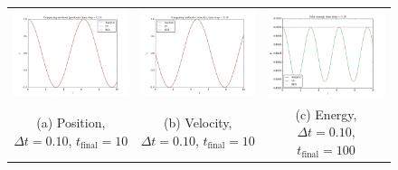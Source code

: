 \documentclass{article}
\begin{document}
\begin{multicols}{2}
\begin{figure}
\begin{center}
\begin{tabular}{ccc}
  	\includegraphics[width=60mm]{Images/comparison_x_01.png}
	& \includegraphics[width=60mm]{Images/comparison_v_01.png}
	& \includegraphics[width=60mm]{Images/comparison_E_01.png} \\
	(a) Position, $\Delta t = 0.10$, $t_{\mathrm{final}} = 10$		& (b) Velocity, $\Delta t = 0.10$, $t_{\mathrm{final}} = 10$  	& (c) Energy, $\Delta t = 0.10$, $t_{\mathrm{final}} = 100$ \\[6pt]
	

\end{tabular}
\end{center}
\end{figure}
\end{multicols}
\end{document}
